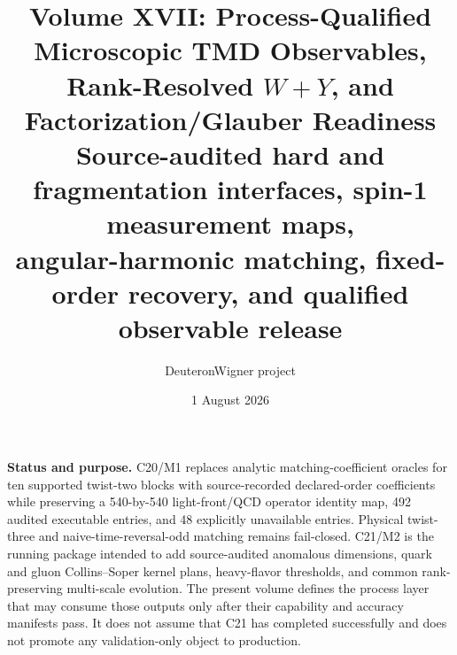 \documentclass[11pt]{article}
\title{\vspace{-1.0cm}
{\color{navy}\bfseries Volume XVII: Process-Qualified Microscopic TMD Observables,\\[2mm]
Rank-Resolved \(W+Y\), and Factorization/Glauber Readiness}\\[4mm]
\large Source-audited hard and fragmentation interfaces, spin-1 measurement maps,\\
angular-harmonic matching, fixed-order recovery, and qualified observable release}
\author{DeuteronWigner project}
\date{1 August 2026}
\begin{document}
\maketitle

\begin{center}
\begin{minipage}{0.94\textwidth}
\colorbox{softblue}{\parbox{0.96\textwidth}{
\textbf{Status and purpose.}
C20/M1 replaces analytic matching-coefficient oracles for ten supported twist-two blocks with source-recorded declared-order coefficients while preserving a 540-by-540 light-front/QCD operator identity map, 492 audited executable entries, and 48 explicitly unavailable entries.  Physical twist-three and naive-time-reversal-odd matching remains fail-closed.  C21/M2 is the running package intended to add source-audited anomalous dimensions, quark and gluon Collins--Soper kernel plans, heavy-flavor thresholds, and common rank-preserving multi-scale evolution.  The present volume defines the process layer that may consume those outputs only after their capability and accuracy manifests pass.  It does not assume that C21 has completed successfully and does not promote any validation-only object to production.
}}
\end{minipage}
\end{center}
\end{document}
